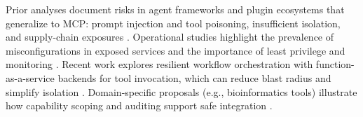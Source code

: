 Prior analyses document risks in agent frameworks and plugin ecosystems that generalize to MCP: prompt injection and tool poisoning, insufficient isolation, and supply-chain exposures \cite{arXiv250323278,arXiv250812566}. Operational studies highlight the prevalence of misconfigurations in exposed services and the importance of least privilege and monitoring \cite{MDPIElectronics3267}. Recent work explores resilient workflow orchestration with function-as-a-service backends for tool invocation, which can reduce blast radius and simplify isolation \cite{arXiv250907595}. Domain-specific proposals (e.g., bioinformatics tools) illustrate how capability scoping and auditing support safe integration \cite{arXiv250708055}.

